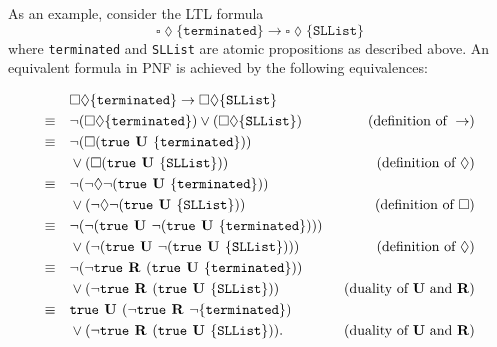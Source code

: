 \documentclass[a4paper, 12pt, twoside]{report}
\begin{document}
	As an example, consider the LTL formula \[\square \lozenge \{\texttt{terminated}\} \rightarrow \square \lozenge \{\texttt{SLList}\}\] where \texttt{terminated} and \texttt{SLList} are atomic propositions as described above. An equivalent formula in PNF is achieved by the following equivalences:
	
	\begin{align*}
		&\square \lozenge \{\texttt{terminated}\} \rightarrow \square \lozenge \{\texttt{SLList}\} \\
		\equiv \quad &\neg(\square \lozenge \{\texttt{terminated}\}) \vee (\square \lozenge \{\texttt{SLList}\}) \qquad &(\text{definition of } \rightarrow) \\
		\equiv \quad &\neg(\square (\text{\texttt{true}} \text{\textbf{ U }} \{\texttt{terminated}\})) \\&\vee (\square (\text{\texttt{true}} \text{\textbf{ U }} \{\texttt{SLList}\})) \qquad &(\text{definition of } \lozenge) \\
		\equiv \quad &\neg(\neg\lozenge\neg (\text{\texttt{true}} \text{\textbf{ U }} \{\texttt{terminated}\}))\\ &\vee (\neg\lozenge\neg (\text{\texttt{true}} \text{\textbf{ U }} \{\texttt{SLList}\})) \qquad &(\text{definition of } \square) \\
		\equiv \quad &\neg(\neg(\text{\texttt{true}}  \text{\textbf{ U }} \neg (\text{\texttt{true}} \text{\textbf{ U }} \{\texttt{terminated}\})))\\ &\vee (\neg(\text{\texttt{true}} \text{\textbf{ U }} \neg (\text{\texttt{true}} \text{\textbf{ U }} \{\texttt{SLList}\}))) \qquad &(\text{definition of } \lozenge) \\
		\equiv \quad &\neg(\neg\text{\texttt{true}}  \text{\textbf{ R }} (\text{\texttt{true}} \text{\textbf{ U }} \{\texttt{terminated}\}))\\ &\vee (\neg\text{\texttt{true}} \text{\textbf{ R }} (\text{\texttt{true}} \text{\textbf{ U }} \{\texttt{SLList}\})) \qquad &(\text{duality of } \text{\textbf{U}} \text{ and } \text{\textbf{R}}) \\
		\equiv \quad &\text{\texttt{true}}  \text{\textbf{ U }} (\neg\text{\texttt{true}} \text{\textbf{ R }} \neg\{\texttt{terminated}\}) \\&\vee (\neg\text{\texttt{true}} \text{\textbf{ R }} (\text{\texttt{true}} \text{\textbf{ U }} \{\texttt{SLList}\})). \qquad &(\text{duality of } \text{\textbf{U}} \text{  and } \text{\textbf{R}}) \\
	\end{align*}	
	
\end{document}
